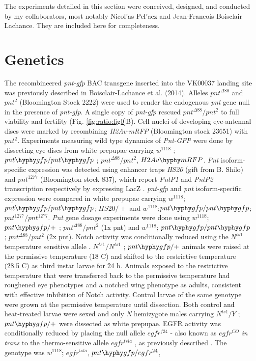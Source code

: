 \graphicspath{ {./figures/ratio/} }


The experiments detailed in this section were conceived, designed, and conducted by my collaborators, most notably Nicol'{a}s Pel'{a}ez and Jean-Francois Boisclair Lachance. They are included here for completeness.

\section{Genetics}
\label{appendix:ratio:genetics}

The recombineered \textit{pnt-gfp} BAC transgene inserted into the VK00037 landing site was previously described in Boisclair-Lachance et al. (2014). Alleles $pnt^{\Delta 88}$ \cite{ONeill1994a} and $pnt^2$ (Bloomington Stock 2222) were used to render the endogenous \textit{pnt} gene null in the presence of \textit{pnt-gfp}. A single copy of \textit{pnt-gfp} rescued $pnt^{\Delta 88}/pnt^2$ to full viability and fertility (Fig. \ref{fig:ratio:fig0}B). Cell nuclei of developing eye-antennal discs were marked by recombining \textit{H2Av-mRFP} (Bloomington stock 23651) with $pnt^2$. Experiments measuring wild type dynamics of \textit{Pnt-GFP} were done by dissecting eye discs from white prepupae carrying $w^{1118}$ ; $pnt\hyphy gfp / pnt\hyphy gfp$ ; $pnt^{\Delta 88}/pnt^2$, $H2Av\hyphy mRFP$. \textit{Pnt} isoform-specific expression was detected using enhancer traps \textit{HS20} (gift from B. Shilo) and $pnt^{1277}$ (Bloomington stock 837), which report \textit{PntP1} and \textit{PntP2} transcription respectively by expressing LacZ \cite{Scholz1993}. \textit{pnt-gfp} and \textit{pnt} isoform-specific expression were compared in white prepupae carrying $w^{1118}$; $pnt\hyphy gfp/pnt\hyphy gfp$; $HS20/+$ and $w^{1118}$;$pnt\hyphy gfp/pnt\hyphy gfp$; $pnt^{1277}/pnt^{1277}$. \textit{Pnt} gene dosage experiments were done using $w^{1118}$; $pnt\hyphy gfp/+$ ; $pnt^{\Delta 88}/pnt^2$ (1x pnt) and $w^{1118}$; $pnt\hyphy gfp/pnt\hyphy gfp$ ; $pnt^{\Delta 88}/pnt^2$ (2x pnt). Notch activity was conditionally reduced using the $N^{ts1}$ temperature sensitive allele \cite{Shellenbarger1975}. $N^{ts1}/N^{ts1}$ ; $pnt\hyphy gfp/+$ animals were raised at the permissive temperature (18 \textdegree{}C) and shifted to the restrictive temperature (28.5 \textdegree{}C) as third instar larvae for 24 h. Animals exposed to the restrictive temperature that were transferred back to the permissive temperature had roughened eye phenotypes and a notched wing phenotype as adults, consistent with effective inhibition of Notch activity. Control larvae of the same genotype were grown at the permissive temperature until dissection. Both control and heat-treated larvae were sexed and only \textit{N} hemizygote males carrying $N^{ts1}/Y$ ; $pnt\hyphy gfp/+$ were dissected as white prepupae. EGFR activity was conditionally reduced by placing the null allele $egfr^{f24}$ - also known as $egfr^{CO}$ \cite{Clifford1989} \textit{in trans} to the thermo-sensitive allele $egfr^{tsla}$ \cite{Kumar1998}, as previously described \cite{Pelaez2015a}. The genotype was $w^{1118}$; $egfr^{tsla}$, $pnt\hyphy gfp/egfr^{24}$, 